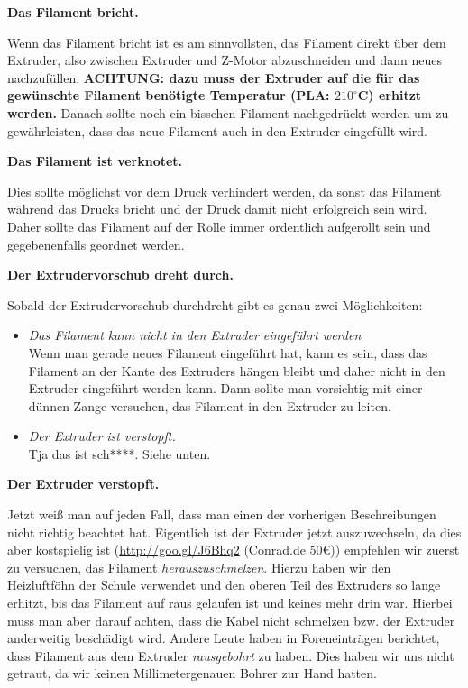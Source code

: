 \documentclass[11pt,a4paper]{scrartcl}
\begin{document}
\begin{description}
\item \textbf{Das Filament bricht.}\\
Wenn das Filament bricht ist es am sinnvollsten, das Filament direkt über dem Extruder, also zwischen Extruder und Z-Motor abzuschneiden und dann neues nachzufüllen. \textbf{ACHTUNG: dazu muss der Extruder auf die für das gewünschte Filament benötigte Temperatur (PLA: $210^\circ$C) erhitzt werden.} Danach sollte noch ein bisschen Filament nachgedrückt werden um zu gewährleisten, dass das neue Filament auch in den Extruder eingefüllt wird.

\item \textbf{Das Filament ist verknotet.}\\
Dies sollte möglichst vor dem Druck verhindert werden, da sonst das Filament während das Drucks bricht und der Druck damit nicht erfolgreich sein wird. Daher sollte das Filament auf der Rolle immer ordentlich aufgerollt sein und gegebenenfalls geordnet werden.

\item \textbf{Der Extrudervorschub dreht durch.}
Sobald der Extrudervorschub durchdreht gibt es genau zwei Möglichkeiten:
\begin{itemize}
\item \textit{Das Filament kann nicht in den Extruder eingeführt werden}\\
Wenn man gerade neues Filament eingeführt hat, kann es sein, dass das Filament an der Kante des Extruders hängen bleibt und daher nicht in den Extruder eingeführt werden kann. Dann sollte man vorsichtig mit einer dünnen Zange versuchen, das Filament in den Extruder zu leiten.
\item \textit{Der Extruder ist verstopft.}\\
Tja das ist sch****. Siehe unten.
\end{itemize}

\item \textbf{Der Extruder verstopft.}\\
Jetzt weiß man auf jeden Fall, dass man einen der vorherigen Beschreibungen nicht richtig beachtet hat. Eigentlich ist der Extruder jetzt auszuwechseln, da dies aber kostspielig ist (\url{http://goo.gl/J6Bhq2} (Conrad.de 50\euro)) empfehlen wir zuerst zu versuchen, das Filament \textit{herauszuschmelzen}. Hierzu haben wir den Heizluftföhn der Schule verwendet und den oberen Teil des Extruders so lange erhitzt, bis das Filament auf raus gelaufen ist und keines mehr drin war. Hierbei muss man aber darauf achten, dass die Kabel nicht schmelzen bzw. der Extruder anderweitig beschädigt wird. Andere Leute haben in Foreneinträgen berichtet, dass Filament aus dem Extruder \textit{rausgebohrt} zu haben. Dies haben wir uns nicht getraut, da wir keinen Millimetergenauen Bohrer zur Hand hatten.


\end{description}
\end{document}
